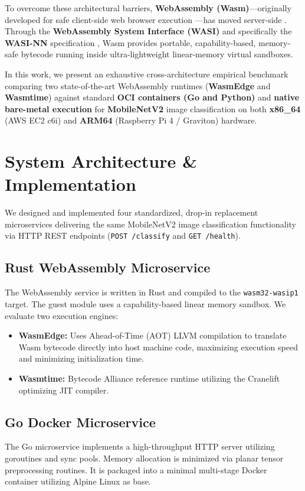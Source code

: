 \documentclass[conference]{IEEEtran}
\begin{document}
To overcome these architectural barriers, \textbf{WebAssembly (Wasm)}---originally developed for safe client-side web browser execution \cite{haas2017bringing}---has moved server-side \cite{gadepalli2020sledge, shillaker2020faasm}. Through the \textbf{WebAssembly System Interface (WASI)} \cite{gohman2021wasi} and specifically the \textbf{WASI-NN} specification \cite{bytecode2021wasi_nn}, Wasm provides portable, capability-based, memory-safe bytecode running inside ultra-lightweight linear-memory virtual sandboxes.

In this work, we present an exhaustive cross-architecture empirical benchmark comparing two state-of-the-art WebAssembly runtimes (\textbf{WasmEdge} and \textbf{Wasmtime}) against standard \textbf{OCI containers (Go and Python)} and \textbf{native bare-metal execution} for \textbf{MobileNetV2} image classification on both \textbf{x86\_64} (AWS EC2 c6i) and \textbf{ARM64} (Raspberry Pi 4 / Graviton) hardware.

\section{System Architecture \& Implementation}
We designed and implemented four standardized, drop-in replacement microservices delivering the same MobileNetV2 image classification functionality via HTTP REST endpoints (\texttt{POST /classify} and \texttt{GET /health}).

\subsection{Rust WebAssembly Microservice}
The WebAssembly service is written in Rust and compiled to the \texttt{wasm32-wasip1} target. The guest module uses a capability-based linear memory sandbox. We evaluate two execution engines:
\begin{itemize}
    \item \textbf{WasmEdge:} Uses Ahead-of-Time (AOT) LLVM compilation to translate Wasm bytecode directly into host machine code, maximizing execution speed and minimizing initialization time.
    \item \textbf{Wasmtime:} Bytecode Alliance reference runtime utilizing the Cranelift optimizing JIT compiler.
\end{itemize}

\subsection{Go Docker Microservice}
The Go microservice implements a high-throughput HTTP server utilizing goroutines and sync pools. Memory allocation is minimized via planar tensor preprocessing routines. It is packaged into a minimal multi-stage Docker container utilizing Alpine Linux as base.
\end{document}
